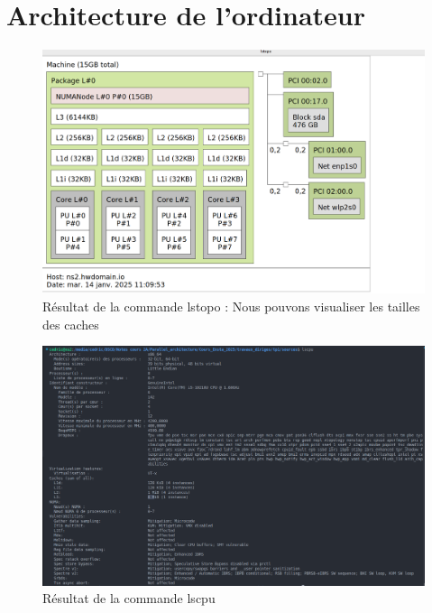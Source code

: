 \documentclass[a4paper,13pt]{book}
\author{\bsc{DADA SIMEU Cédric Darel}}
\begin{document}
  
\tableofcontents
\listoffigures
\newpage
\section{Architecture de l'ordinateur}
\begin{figure}[!h]
  \begin{center}
      \includegraphics[scale=0.3]{../images/lstopo.png}
      \caption{Résultat de la commande lstopo : Nous pouvons visualiser les tailles des caches}
      \label{tab:ls_topo}
  \end{center}
\end{figure}
\begin{figure}[!h]
  \begin{center}
  \includegraphics[scale=0.5]{../images/lscpu.png}
  \caption{Résultat de la commande lscpu}
  \label{tab:lscpu}
\end{center}
\end{figure}
\end{document}
